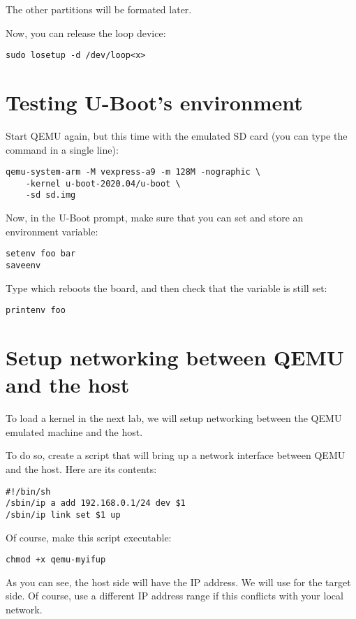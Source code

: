 The other partitions will be formated later.

Now, you can release the loop device:
\begin{verbatim}
sudo losetup -d /dev/loop<x>
\end{verbatim}

\section{Testing U-Boot's environment}

Start QEMU again, but this time with the emulated SD card
(you can type the command in a single line):

\begin{verbatim}
qemu-system-arm -M vexpress-a9 -m 128M -nographic \
	-kernel u-boot-2020.04/u-boot \
	-sd sd.img
\end{verbatim}

Now, in the U-Boot prompt, make sure that you can set and store an environment variable:

\begin{verbatim}
setenv foo bar
saveenv
\end{verbatim}

Type  which reboots the board, and then check that the
 variable is still set:

\begin{verbatim}
printenv foo
\end{verbatim}

\section{Setup networking between QEMU and the host}

To load a kernel in the next lab, we will setup networking between the QEMU emulated
machine and the host.

To do so, create a  script that will bring up a
network interface between QEMU and the host.  Here are its contents:

\begin{verbatim}
#!/bin/sh
/sbin/ip a add 192.168.0.1/24 dev $1
/sbin/ip link set $1 up
\end{verbatim}

Of course, make this script executable:
\begin{verbatim}
chmod +x qemu-myifup
\end{verbatim}

As you can see, the host side will have the  IP
address. We will use  for the target side.
Of course, use a different IP address range if this conflicts with your
local network.

